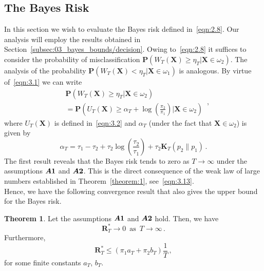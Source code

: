 \documentclass[lettersize,journal,onecolumn]{IEEEtran}
\theoremstyle{definition}
\newtheorem{theorem}{Theorem}
\newcommand{\assumption}[1]{{\rm \boldsymbol{A#1}}}
\begin{document}

\subsection{The Bayes Risk}
\label{subsec:03_bayes_bounds/risk}

\noindent In this section we wish to evaluate the Bayes risk defined in~\eqref{eqn:2.8}. 
Our analysis will employ the results obtained 
in Section~\ref{subsec:03_bayes_bounds/decision}. Owing 
to~\eqref{eqn:2.8} it suffices to consider the probability of misclassification
$\mathbf{P}\left(W_{T}(\mathbf{X})\geq\eta_{T}|\mathbf{X}\in\omega_{2}\right)$. The 
analysis of the probability 
$\mathbf{P}\left(W_{T}(\mathbf{X})<\eta_{T}|\mathbf{X}\in\omega_{1}\right)$ is
analogous. By virtue of~\eqref{eqn:3.1} we can write 
\begin{equation}
	\begin{split}
		& \mathbf{P}\left(W_{T}(\mathbf{X})\geq\eta_{T}|\mathbf{X}\in\omega_{2}\right) \\
		& = 
		\mathbf{P}\left(U_{T}(\mathbf{X})\geq\alpha_{T} +
		\log\left(\frac{\pi_{2}}{\pi_{1}}\right)
		|\mathbf{X}\in\omega_{2}\right)
	\end{split}
	\label{eqn:3.19}\,,
\end{equation}
where $U_{T}(\mathbf{X})$ is defined in~\eqref{eqn:3.2} and $\alpha_{T}$
(under the fact that $\mathbf{X}\in\omega_{2}$) is given by
\begin{equation}
	\alpha_{T} =
	\tau_{1} - \tau_{2} + \tau_{2}
	\log\left(\frac{\tau_{2}}{\tau_{1}}\right) +
	\tau_{2}\mathbf{K}_T(p_{2} \parallel p_{1})
	\label{eqn:3.20}\,.
\end{equation}
The first result reveals that the Bayes risk tends to zero as $T\to\infty$ under
the assumptions $\assumption{1}$ and $\assumption{2}$. 
This is the direct consequence of the weak law of large numbers 
established in Theorem~\ref{theorem:1}, see~\eqref{eqn:3.13}. \\
Hence, we have the 
following convergence result that also gives the upper bound for the Bayes risk.
\begin{theorem}
	\label{theorem:3}
	Let the assumptions $\assumption{1}$ and $\assumption{2}$ hold. Then, we have
	\begin{equation*}
		\mathbf{R}_{T}^{*} \to 0 \enspace \text{as} \enspace T\to\infty
		\,.
	\end{equation*}
	Furthermore,
	\begin{equation}
		\mathbf{R}_{T}^{*} \leq 
		\left(\pi_{1}a_{T} + \pi_{2}b_{T}\right) \frac{1}{T}
		\label{eqn:3.21} \,,
	\end{equation}
	for some finite constants $a_{T}$, $b_{T}$.
\end{theorem}
\end{document}
